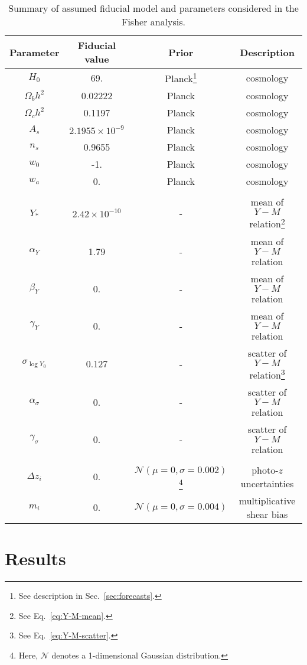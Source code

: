 \documentclass[%
 reprint,
nofootinbib,
 amsmath,amssymb,
 aps,
]{revtex4-1}
\newcommand\Tstrut{\rule{0pt}{3ex}}
\begin{document}
\begin{table*}
\caption{Summary of assumed fiducial model and parameters considered in the Fisher analysis.} \label{tab:fiducial-model}
\begin{center}
\begin{ruledtabular}
\begin{tabular}{cccc}
Parameter & Fiducial value & Prior & Description \\ \hline \Tstrut           
$H_{0}$ & 69. & Planck\footnote{See description in Sec.~\ref{sec:forecasts}.} & cosmology \\
$\Omega_{b}h^{2}$ & 0.02222 & Planck & cosmology \\
$\Omega_{c}h^{2}$ & 0.1197 &  Planck & cosmology \\
$A_{s}$ & $2.1955 \times 10^{-9}$ & Planck & cosmology \\
$n_{s}$ & 0.9655 & Planck & cosmology \\
$w_{0}$ & -1. & Planck & cosmology \\
$w_{a}$ & 0. & Planck & cosmology \\ \\     
$Y_{*}$ & $2.42 \times 10^{-10}$ & - & mean of $Y-M$ relation\footnote{See Eq.~\ref{eq:Y-M-mean}.} \\
$\alpha_{Y}$ & 1.79 & - & mean of $Y-M$ relation\\
$\beta_{Y}$ & 0. & - & mean of $Y-M$ relation\\
$\gamma_{Y}$ & 0. & - & mean of $Y-M$ relation \\
$\sigma_{\log{Y_{0}}}$ & 0.127 & - & scatter of $Y-M$ relation\footnote{See Eq.~\ref{eq:Y-M-scatter}.}  \\
$\alpha_{\sigma}$ & 0. & - & scatter of $Y-M$ relation\\
$\gamma_{\sigma}$ & 0. & - & scatter of $Y-M$ relation\\ \\
$\Delta z_{i}$ & 0. & $\mathcal{N}(\mu = 0, \sigma=0.002)$\footnote{Here, $\mathcal{N}$ denotes a 1-dimensional Gaussian distribution.} & photo-$z$ uncertainties \\ 
$m_{i}$ & 0. & $\mathcal{N}(\mu = 0, \sigma=0.004)$ & multiplicative shear bias \\
\end{tabular}
\end{ruledtabular}
\end{center}
\end{table*} 

\section{Results}\label{sec:results}
\end{document}
